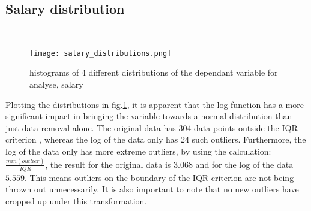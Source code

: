 \documentclass[journal]{IEEEtran}
\begin{document}
\subsection{Salary distribution}
\\
\begin{figure}[h]
    \centering
    \texttt{[image: salary\_distributions.png]}
    \caption{histograms of 4 different distributions of the dependant variable for analyse, salary}
    \label{fig:salary_distributions}
\end{figure}
\indent
Plotting the distributions in fig.\ref{fig:salary_distributions}, it is apparent that the log function has a more significant impact in bringing the variable towards a normal distribution than just data removal alone. The original data has 304 data points outside the IQR criterion \cite{iqr_outlier}, whereas the log of the data only has 24 such outliers. Furthermore, the log of the data only has more extreme outliers, by using the calculation: $\frac{min(outlier)}{IQR}$, the result for the original data is $3.068$ and for the log of the data $5.559$. This means outliers on the boundary of the IQR criterion are not being thrown out unnecessarily. It is also important to note that no new outliers have cropped up under this transformation. \\
\end{document}
